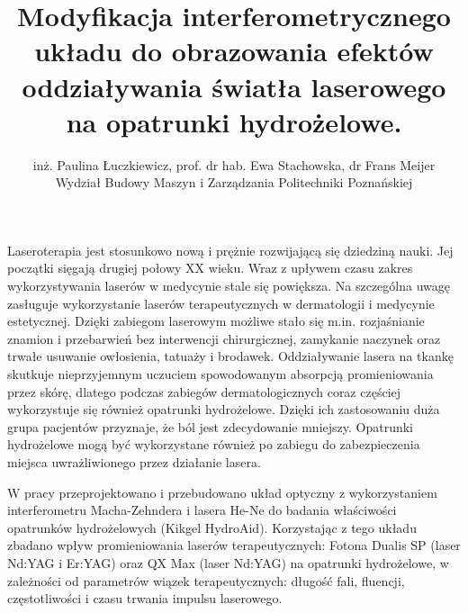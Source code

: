 \documentclass[12pt, a4paper]{article}
\begin{document}
\title{Modyfikacja interferometrycznego układu do obrazowania efektów oddziaływania światła laserowego na opatrunki hydrożelowe.}
\author{inż. Paulina Łuczkiewicz, prof. dr hab. Ewa Stachowska, dr Frans Meijer \\ Wydział Budowy Maszyn i Zarządzania Politechniki Poznańskiej}
\date {}
\maketitle
\thispagestyle{title}
Laseroterapia jest stosunkowo nową i prężnie rozwijającą się dziedziną nauki. Jej początki sięgają drugiej połowy XX wieku. Wraz z upływem czasu zakres wykorzystywania laserów w medycynie stale się powiększa. Na szczególna uwagę zasługuje wykorzystanie laserów terapeutycznych w dermatologii i medycynie estetycznej. Dzięki zabiegom laserowym możliwe stało się m.in. rozjaśnianie znamion i przebarwień bez interwencji chirurgicznej, zamykanie naczynek oraz trwałe usuwanie owłosienia, tatuaży i brodawek. Oddziaływanie lasera na tkankę skutkuje nieprzyjemnym uczuciem spowodowanym absorpcją promieniowania przez skórę, dlatego podczas zabiegów dermatologicznych coraz częściej wykorzystuje się również opatrunki hydrożelowe. Dzięki ich zastosowaniu duża grupa pacjentów przyznaje, że ból jest zdecydowanie mniejszy. Opatrunki hydrożelowe mogą być wykorzystane również po zabiegu do zabezpieczenia miejsca uwrażliwionego przez działanie lasera.

W pracy przeprojektowano i przebudowano układ optyczny z wykorzystaniem interferometru Macha-Zehndera i lasera He-Ne do badania właściwości opatrunków hydrożelowych (Kikgel HydroAid). Korzystając z tego układu zbadano wpływ promieniowania laserów terapeutycznych:  Fotona Dualis SP (laser Nd:YAG i Er:YAG) oraz QX Max (laser Nd:YAG) na opatrunki hydrożelowe, w zależności od parametrów wiązek terapeutycznych: długość fali, fluencji, częstotliwości i czasu trwania impulsu laserowego. 
\end{document}
